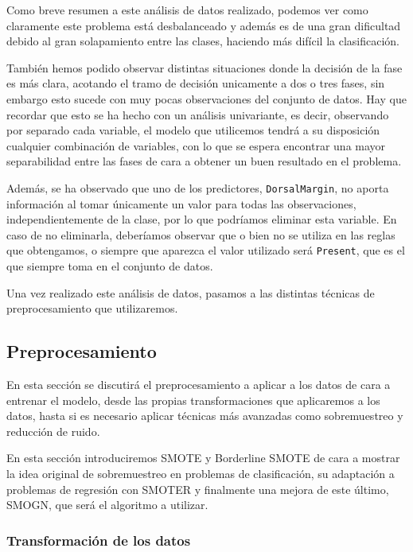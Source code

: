 Como breve resumen a este análisis de datos realizado, podemos ver como claramente este problema está desbalanceado y además es de una gran dificultad debido al gran solapamiento entre las clases, haciendo más difícil la clasificación.

También hemos podido observar distintas situaciones donde la decisión de la fase es más clara, acotando el tramo de decisión unicamente a dos o tres fases, sin embargo esto sucede con muy pocas observaciones del conjunto de datos. Hay que recordar que esto se ha hecho con un análisis univariante, es decir, observando por separado cada variable, el modelo que utilicemos tendrá a su disposición cualquier combinación de variables, con lo que se espera encontrar una mayor separabilidad entre las fases de cara a obtener un buen resultado en el problema.

Además, se ha observado que uno de los predictores, \texttt{DorsalMargin}, no aporta información al tomar únicamente un valor para todas las observaciones, independientemente de la clase, por lo que podríamos eliminar esta variable. En caso de no eliminarla, deberíamos observar que o bien no se utiliza en las reglas que obtengamos, o siempre que aparezca el valor utilizado será \texttt{Present}, que es el que siempre toma en el conjunto de datos.

Una vez realizado este análisis de datos, pasamos a las distintas técnicas de preprocesamiento que utilizaremos.


\subsection{Preprocesamiento} \label{sobremuestreo}

En esta sección se discutirá el preprocesamiento a aplicar a los datos de cara a entrenar el modelo, desde las propias transformaciones que aplicaremos a los datos, hasta si es necesario aplicar técnicas más avanzadas como sobremuestreo y reducción de ruido.

En esta sección introduciremos SMOTE y Borderline SMOTE de cara a mostrar la idea original de sobremuestreo en problemas de clasificación, su adaptación a problemas de regresión con SMOTER y finalmente una mejora de este último, SMOGN, que será el algoritmo a utilizar.

\subsubsection{Transformación de los datos}


